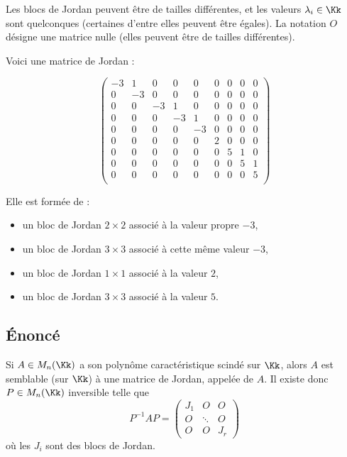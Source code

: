\documentclass[12pt, class=report,crop=false]{standalone}
\begin{document}
Les blocs de Jordan peuvent être de tailles différentes, et les valeurs $\lambda_i \in \Kk$ sont quelconques (certaines d'entre elles peuvent être égales).
La notation $O$ désigne une matrice nulle (elles peuvent être de tailles différentes).


\begin{exemple}
Voici une matrice de Jordan : 



\[
\left(\begin{array}{cc|ccc|c|ccc}
-3	&	1	&	0	&	0	&	0	&	0	&	0	&	0	&	0\\
0	&	-3	&	0	&	0	&	0	&	0	&	0	&	0	&	0\\ \hline
0	&	0	&	-3	&	1	&	0	&	0	&	0	&	0	&	0\\
0	&	0	&	0	&	-3	& 	1	&	0	&	0	&	0	&	0\\
0	&	0	&	0	&	0	& 	-3	&	0	&	0	&	0	&	0\\ \hline
0	&	0	&	0	&	0	& 	0	&	2	&	0	&	0	&	0\\ \hline
0	&	0	&	0	&	0	&	0	&	0	&	5	&	1	&	0\\
0	&	0	&	0	&	0	&	0	&	0	&	0	&	5	& 	1\\
0	&	0	&	0	&	0	&	0	&	0	&	0	&	0	& 	5\\
\end{array}\right)
\]

\bigskip
Elle est formée de :
\begin{itemize}
  \item un bloc de Jordan $2 \times 2$ associé à la valeur propre $-3$,
  \item un bloc de Jordan $3 \times 3$ associé à cette même valeur $-3$, 
  \item un bloc de Jordan $1 \times 1$ associé à la valeur $2$, 
  \item un bloc de Jordan $3 \times 3$ associé à la valeur $5$. 
\end{itemize}
\end{exemple}



\subsection{\'Enoncé}

\begin{theoreme}
Si $A \in M_n(\Kk)$ a son polynôme caractéristique scindé sur $\Kk$, alors $A$ est semblable (sur $\Kk$) à une matrice de Jordan, appelée  de $A$. Il existe donc $P \in M_n(\Kk)$ inversible telle que
\[ P^{-1}AP = \left(\begin{array}{c|c|c}
J_1&O&O\\\hline
O&\ddots&O\\\hline
O&O&J_r
\end{array}\right)\]
où les $J_i$ sont des blocs de Jordan.
\end{theoreme}
\end{document}
